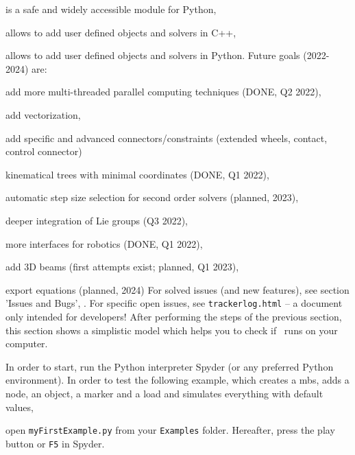   \item is a safe and widely accessible module for Python,
  \item allows to add user defined objects and solvers in C++,
  \item allows to add user defined objects and solvers in Python.
\ei
Future goals (2022-2024) are:
\bi
  \item add more multi-threaded parallel computing techniques (DONE, Q2 2022),
  \item add vectorization,
  \item add specific and advanced connectors/constraints (extended wheels, contact, control connector)
  \item kinematical trees with minimal coordinates (DONE, Q1 2022),
  \item automatic step size selection for second order solvers (planned, 2023),
  \item deeper integration of Lie groups (Q3 2022),
  \item more interfaces for robotics (DONE, Q1 2022),
  \item add 3D beams (first attempts exist; planned, Q1 2023),
  \item export equations (planned, 2024)
\ei
For solved issues (and new features), see section 'Issues and Bugs', .
For specific open issues, see \texttt{trackerlog.html} -- a document only intended for developers!
%
After performing the steps of the previous section, this section shows a simplistic model which helps you to check if \codeName\ runs on your computer.

In order to start, run the Python interpreter Spyder (or any preferred Python environment).
In order to test the following example, which creates a \ac{mbs}, adds a node, an object, a marker and a load and simulates everything with default values, 
\bi
{}
\item open \texttt{myFirstExample.py} from your \texttt{Examples} folder.
\ei
Hereafter, press the play button or \texttt{F5} in Spyder.
%

